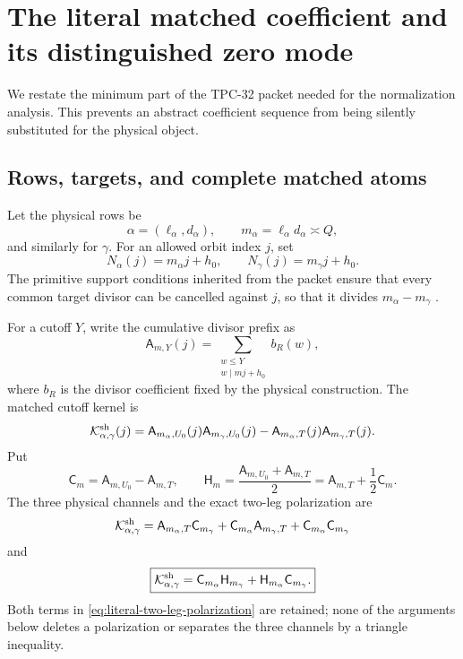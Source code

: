 \section{The literal matched coefficient and its distinguished zero mode}
\label{sec:literal-zero-mode}

We restate the minimum part of the TPC-32 packet needed for the
normalization analysis.  This prevents an abstract coefficient
sequence from being silently substituted for the physical object.

\subsection{Rows, targets, and complete matched atoms}

Let the physical rows be
\[
 \alpha=(\ell_\alpha,d_\alpha),\qquad
 m_\alpha=\ell_\alpha d_\alpha\asymp Q,
\]
and similarly for \(\gamma\).  For an allowed orbit index \(j\), set
\begin{equation}
 N_\alpha(j)=m_\alpha j+h_0,
 \qquad
 N_\gamma(j)=m_\gamma j+h_0.
 \label{eq:literal-targets}
\end{equation}
The primitive support conditions inherited from the packet ensure
that every common target divisor can be cancelled against \(j\), so
that it divides \(m_\alpha-m_\gamma\)
\citep{WangTPC30,WangTPC32}.

For a cutoff \(Y\), write the cumulative divisor prefix as
\begin{equation}
 \mathsf A_{m,Y}(j)
 =\sum_{\substack{w\le Y\\w\mid mj+h_0}}b_R(w),
 \label{eq:literal-divisor-prefix}
\end{equation}
where \(b_R\) is the divisor coefficient fixed by the physical
construction.  The matched cutoff kernel is
\begin{equation}
 \mathcal K^{\rm sh}_{\alpha,\gamma}(j)
 =
 \mathsf A_{m_\alpha,U_0}(j)
 \mathsf A_{m_\gamma,U_0}(j)
 -
 \mathsf A_{m_\alpha,T}(j)
 \mathsf A_{m_\gamma,T}(j).
 \label{eq:literal-matched-kernel}
\end{equation}
Put
\[
 \mathsf C_m
 =\mathsf A_{m,U_0}-\mathsf A_{m,T},
 \qquad
 \mathsf H_m
 =\frac{\mathsf A_{m,U_0}+\mathsf A_{m,T}}2
 =\mathsf A_{m,T}+\frac12\mathsf C_m.
\]
The three physical channels and the exact two-leg polarization are
\begin{equation}
 \mathcal K^{\rm sh}_{\alpha,\gamma}
 =
 \mathsf A_{m_\alpha,T}\mathsf C_{m_\gamma}
 +\mathsf C_{m_\alpha}\mathsf A_{m_\gamma,T}
 +\mathsf C_{m_\alpha}\mathsf C_{m_\gamma}
 \label{eq:literal-three-channel-expansion}
\end{equation}
and
\begin{equation}
 \boxed{
 \mathcal K^{\rm sh}_{\alpha,\gamma}
 =\mathsf C_{m_\alpha}\mathsf H_{m_\gamma}
  +\mathsf H_{m_\alpha}\mathsf C_{m_\gamma}.}
 \label{eq:literal-two-leg-polarization}
\end{equation}
Both terms in \eqref{eq:literal-two-leg-polarization} are retained;
none of the arguments below deletes a polarization or separates the
three channels by a triangle inequality.

